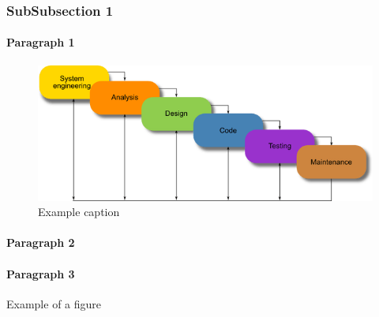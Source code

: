 \documentclass[a4paper, 11pt]{article} %
\begin{document}
\subsubsection{SubSubsection 1}
\lipsum[1] %

\paragraph{Paragraph 1}
\lipsum[2]

	\begin{figure}[H]
	\centering
	\includegraphics[scale=0.5]{waterfall-model}
	\caption{Example caption}
	\label{fig:Ng1} 
\end{figure}


\paragraph{Paragraph 2}
\lipsum[2]
\paragraph{Paragraph 3}
\lipsum[2]
\pagebreak
Example of a figure








\end{document}
